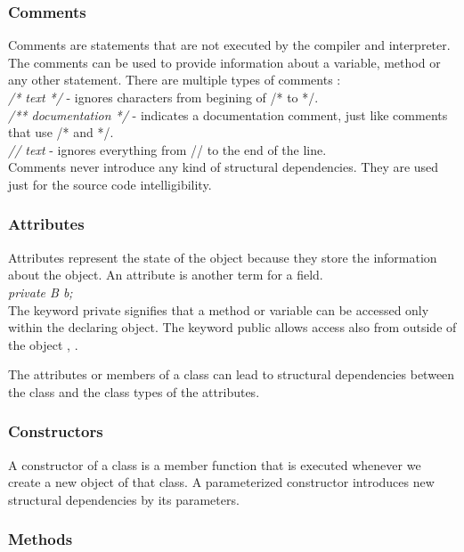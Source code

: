 \subsubsection{Comments}
Comments are statements that are not executed by the compiler and interpreter. The comments can be used to provide information about a variable, method or any other statement. There are multiple types of comments :\\

\textit{/* text */} -  ignores characters from begining of /* to */.\\
\textit{/** documentation */} -  indicates a documentation comment, just like comments that use /* and */.\\
\textit{// text} -  ignores everything from // to the end of the line.\\ 

Comments never introduce any kind of structural dependencies. They are used just for the source code intelligibility.

\subsubsection{Attributes}

Attributes represent the state of the object because they store the information about the object. An attribute is another term for a field. \\

\textit{private B b;}\\
The keyword private signifies that a method or variable can be accessed only within the declaring object. The keyword public allows access also from outside of the object \cite{oop2}, \cite{ct11} .

The attributes or members of a class can lead to structural dependencies between the class and the class types of the attributes.

\subsubsection{Constructors}

A constructor of a class is a member function that is executed whenever we create a new object of that class.  A parameterized constructor introduces new structural dependencies by its parameters.

\subsubsection{Methods}

